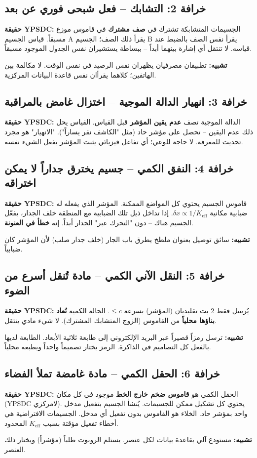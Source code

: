 \documentclass[11pt,a4paper]{article}
\begin{document}
	\subsection{خرافة 2: التشابك -- فعل شبحى فوري عن بعد}
	\textbf{حقيقة YPSDC:} الجسيمات المتشابكة تشترك في \textbf{صف مشترك} في قاموس موزع مسبقاً. قياس الجسيم A يقرأ ذلك الصف؛ الجسيم B يقرأ نفس الصف بالضبط عند قياسه. لا تنتقل أي إشارة بينهما أبداً -- ببساطة يستشيران نفس الجدول الموجود مسبقاً.
	\par
	\textbf{تشبيه:} تطبيقان مصرفيان يظهران نفس الرصيد في نفس الوقت. لا مكالمة بين الهاتفين؛ كلاهما يقرأان نفس قاعدة البيانات المركزية.
	
	\subsection{خرافة 3: انهيار الدالة الموجية -- اختزال غامض بالمراقبة}
	\textbf{حقيقة YPSDC:} الدالة الموجية تصف \textbf{عدم يقين المؤشر} قبل القياس. القياس يحل ذلك عدم اليقين -- تحصل على مؤشر حاد (مثل "الكاشف نقر يساراً"). "الانهيار" هو مجرد تحديث للمعرفة. لا حاجة للوعي؛ أي تفاعل فيزيائي يثبت المؤشر يفعل الشيء نفسه.
	
	\subsection{خرافة 4: النفق الكمي -- جسيم يخترق جداراً لا يمكن اختراقه}
	\textbf{حقيقة YPSDC:} قاموس الجسيم يحتوي كل المواضع الممكنة. المؤشر الذي يفعله له ضبابية مكانية \(\delta x \propto 1/K_{\mathrm{eff}}\). إذا تداخل ذيل تلك الضبابية مع المنطقة خلف الجدار، يفعّل الجسيم هناك -- دون "التحرك عبر" الجدار أبداً. إنه \textbf{خطأ في العنونة}.
	\par
	\textbf{تشبيه:} سائق توصيل بعنوان ملطخ يطرق باب الجار (خلف جدار صلب) لأن المؤشر كان ضبابياً.
	
	\subsection{خرافة 5: النقل الآني الكمي -- مادة تُنقل أسرع من الضوء}
	\textbf{حقيقة YPSDC:} يُرسل فقط 2 بت تقليديان (المؤشر) بسرعة \(\le c\). الحالة الكمية \textbf{تُعاد بناؤها محلياً} من القاموس (الزوج المتشابك المشترك). لا شيء مادي ينتقل.
	\par
	\textbf{تشبيه:} ترسل رمزاً قصيراً عبر البريد الإلكتروني إلى طابعة ثلاثية الأبعاد. الطابعة لديها بالفعل كل التصاميم في الذاكرة. الرمز يختار تصميماً واحداً ويطبعه محلياً.
	
	\subsection{خرافة 6: الحقل الكمي -- مادة غامضة تملأ الفضاء}
	\textbf{حقيقة YPSDC:} الحقل الكمي هو \textbf{قاموس ضخم خارج الخط} موجود في كل مكان (YPSDC لامركزي). يحتوي كل تشكيل ممكن للجسيمات. يُنشأ الجسيم بتفعيل مدخل واحد بمؤشر حاد. الخلاء هو القاموس بدون تفعيل أي مدخل. الجسيمات الافتراضية هي أخطاء تفعيل مؤقتة بسبب \(K_{\mathrm{eff}}\) المحدود.
	\par
	\textbf{تشبيه:} مستودع آلي بقاعدة بيانات لكل عنصر. يستلم الروبوت طلباً (مؤشراً) ويختار ذلك العنصر.
	
\end{document}
